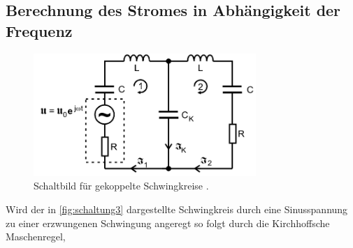 \subsection{Berechnung des Stromes in Abhängigkeit der Frequenz}


\begin{figure}[H]
    \centering
    \includegraphics[width=0.75\textwidth]{plots/Schaltung3.png}
    \caption{Schaltbild für gekoppelte Schwingkreise \cite{Versuchsanleitung}.}
    \label{fig:schaltung3}
\end{figure}

Wird der in \autoref{fig:schaltung3} dargestellte Schwingkreis durch eine Sinusspannung zu einer erzwungenen Schwingung angeregt
so folgt durch die Kirchhoffsche Maschenregel,






